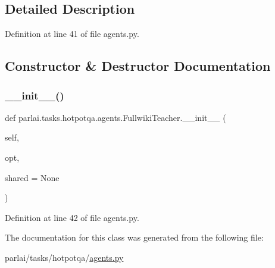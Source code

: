 \subsection{Detailed Description}


Definition at line 41 of file agents.\+py.



\subsection{Constructor \& Destructor Documentation}
\mbox{\label{classparlai_1_1tasks_1_1hotpotqa_1_1agents_1_1FullwikiTeacher_a7e12fc08024330f828800caee978f7d7}} 
\subsubsection{\texorpdfstring{\+\_\+\+\_\+init\+\_\+\+\_\+()}{\_\_init\_\_()}}
{\footnotesize\ttfamily def parlai.\+tasks.\+hotpotqa.\+agents.\+Fullwiki\+Teacher.\+\_\+\+\_\+init\+\_\+\+\_\+ (\begin{DoxyParamCaption}\item[{}]{self,  }\item[{}]{opt,  }\item[{}]{shared = {\ttfamily None} }\end{DoxyParamCaption})}



Definition at line 42 of file agents.\+py.



The documentation for this class was generated from the following file\+:\begin{DoxyCompactItemize}
\item 
parlai/tasks/hotpotqa/\hyperlink{parlai_2tasks_2hotpotqa_2agents_8py}{agents.\+py}\end{DoxyCompactItemize}
